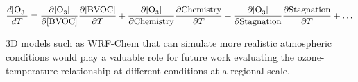 \vspace{-12mm}
\begin{equation*} 
    \frac{d[\ce{O3}]}{dT} = \frac{\partial [\ce{O3}]}{\partial [\text{BVOC}]}\frac{\partial [\text{BVOC}]}{\partial T} + \frac{\partial [\ce{O3}]}{\partial \text{Chemistry}}\frac{\partial \text{Chemistry}}{\partial T} + \frac{\partial [\ce{O3}]}{\partial \text{Stagnation}}\frac{\partial \text{Stagnation}}{\partial T} + \dots
\end{equation*}

\vspace{-4mm}
3D models such as WRF-Chem that can simulate more realistic atmospheric conditions would play a valuable role for future work evaluating the ozone-temperature relationship at different  conditions at a regional scale.
